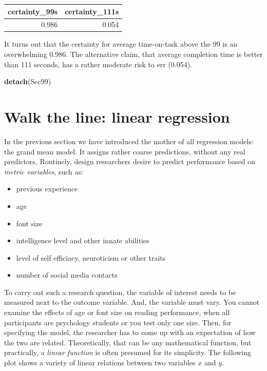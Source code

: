 \documentclass[]{svmono}
\newenvironment{Shaded}{\begin{snugshade}}{\end{snugshade}}
\newcommand{\KeywordTok}[1]{\textcolor[rgb]{0.13,0.29,0.53}{\textbf{#1}}}
\newcommand{\NormalTok}[1]{#1}
\providecommand{\tightlist}{%
  \setlength{\itemsep}{0pt}\setlength{\parskip}{0pt}}
\begin{document}
\begin{tabular}{r|r}
\hline
certainty\_99s & certainty\_111s\\
\hline
0.986 & 0.054\\
\hline
\end{tabular}

It turns out that the certainty for average time-on-task above the 99 is
an overwhelming 0.986. The alternative claim, that average completion
time is better than 111 seconds, has a rather moderate risk to err
(0.054).

\begin{Shaded}
\begin{Highlighting}[]
\KeywordTok{detach}\NormalTok{(Sec99)}
\end{Highlighting}
\end{Shaded}

\section{Walk the line: linear regression}\label{linear-regression}

In the previous section we have introduced the mother of all regression
models: the grand mean model. It assigns rather coarse predictions,
without any real predictors. Routinely, design researchers desire to
predict performance based on \emph{metric variables}, such as:

\begin{itemize}
\tightlist
\item
  previous experience
\item
  age
\item
  font size
\item
  intelligence level and other innate abilities
\item
  level of self efficiacy, neuroticism or other traits
\item
  number of social media contacts
\end{itemize}

To carry out such a research question, the variable of interest needs to
be measured next to the outcome variable. And, the variable must vary.
You cannot examine the effects of age or font size on reading
performance, when all participants are psychology students or you test
only one size. Then, for specifying the model, the researcher has to
come up with an expectation of how the two are related. Theoretically,
that can be any mathematical function, but practically, a \emph{linear
function} is often presumed for its simplicity. The following plot shows
a variety of linear relations between two variables \(x\) and \(y\).
\end{document}
